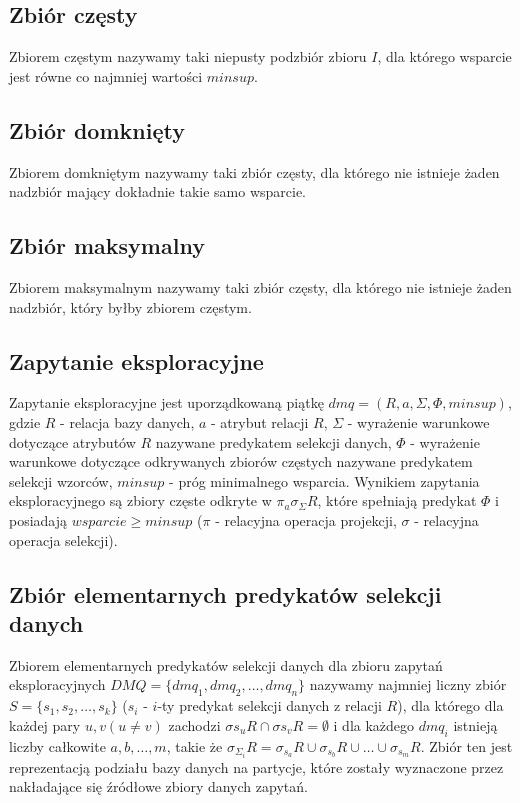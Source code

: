 \subsection{Zbiór częsty}
\label{c226}
Zbiorem częstym nazywamy taki niepusty podzbiór zbioru \(I\), dla którego wsparcie jest równe co najmniej wartości \(minsup\).

\subsection{Zbiór domknięty}
\label{c227}
Zbiorem domkniętym nazywamy taki zbiór częsty, dla którego nie istnieje żaden nadzbiór mający dokładnie takie samo wsparcie.

\subsection{Zbiór maksymalny}
\label{c228}
Zbiorem maksymalnym nazywamy taki zbiór częsty, dla którego nie istnieje żaden nadzbiór, który byłby zbiorem częstym.

\subsection{Zapytanie eksploracyjne}
\label{c229}
Zapytanie eksploracyjne jest uporządkowaną piątkę \(dmq = (R, a, \Sigma, \Phi, minsup) \), gdzie \(R\) - relacja bazy danych, \(a\) - atrybut relacji \(R\), \(\Sigma\) - wyrażenie warunkowe dotyczące atrybutów \(R\) nazywane predykatem selekcji danych, \(\Phi\) - wyrażenie warunkowe dotyczące odkrywanych zbiorów częstych nazywane predykatem selekcji wzorców, \(minsup\) - próg minimalnego wsparcia. Wynikiem zapytania eksploracyjnego są zbiory częste odkryte w \(\pi _a \sigma _\Sigma R \), które spełniają predykat \(\Phi\) i posiadają \(wsparcie \geq minsup\) (\(\pi\) - relacyjna operacja projekcji, \(\sigma\) - relacyjna operacja selekcji).


\subsection{Zbiór elementarnych predykatów selekcji danych}
\label{c2210}
Zbiorem elementarnych predykatów selekcji danych dla zbioru zapytań eksploracyjnych \(DMQ = \{dmq_1, dmq_2, \dots, dmq_n\}\) nazywamy najmniej liczny zbiór \(S = \{s_1, s_2, \dots, s_k\}\) (\(s_i\) - \(i\)-ty predykat selekcji danych z relacji \(R\)), dla którego dla każdej pary \(u, v (u \neq v)\) zachodzi \(\sigma{s_u}R \cap \sigma{s_v}R = \emptyset\)  i dla każdego \(dmq_i\) istnieją liczby całkowite \(a, b, \dots, m\), takie że \(\sigma_{\Sigma_i}R = \sigma_{s_a}R \cup \sigma_{s_b}R \cup \dots \cup \sigma_{s_m}R\). Zbiór ten jest reprezentacją podziału bazy danych na partycje, które zostały wyznaczone przez nakładające się źródłowe zbiory danych zapytań.